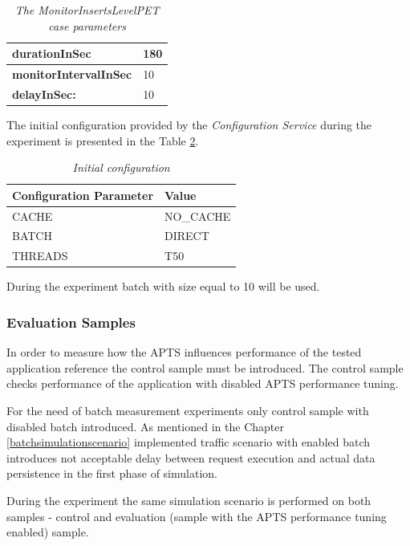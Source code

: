 \documentclass[10pt,a4paper]{article}
\begin{document}
\begin{table}[!htb]
\def\arraystretch{1.5}
\caption{\textit{The MonitorInsertsLevelPET case parameters}} \label{evaluationtestconfbatch}
\begin{tabularx}{\textwidth}{X|X}

\textbf{durationInSec} & 180 \\ \hline
\textbf{monitorIntervalInSec} & 10 \\ \hline
\textbf{delayInSec:} & 10\\
\end{tabularx}
\end{table}

The initial configuration provided by the \textit{Configuration Service} during the experiment is presented in the Table \ref{cacheinitconfbatch}.
\begin{table}[!htb]
\caption{\textit{Initial configuration}} \label{cacheinitconfbatch}
\begin{tabularx}{\textwidth}{X|X}
\textbf{Configuration Parameter} & \textbf{Value} \\ \hline
CACHE & NO\_CACHE \\ \hline
BATCH & DIRECT\\ \hline
THREADS & T50\\
\end{tabularx}
\end{table}

During the experiment batch with size equal to 10 will be used. 

\subsubsection{Evaluation Samples} 

In order to measure how the APTS influences performance of the tested application reference the control sample must be introduced. The control sample checks performance of the application with disabled APTS performance tuning. 

For the need of batch measurement experiments only control sample with disabled batch introduced. As mentioned in the Chapter \ref{batchsimulationscenario} implemented traffic scenario with enabled batch introduces not acceptable delay between request execution and actual data persistence in the first phase of simulation. 

During the experiment the same simulation scenario is performed on both samples - control and evaluation (sample with the APTS performance tuning enabled) sample.
\end{document}
